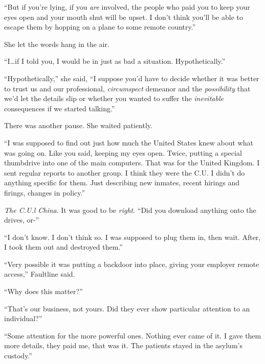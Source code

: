 ``But if you're lying, if you \emph{are} involved, the people who paid you to keep your eyes open and your mouth shut will be upset.  I don't think you'll be able to escape them by hopping on a plane to some remote country.''



She let the words hang in the air.



``I\ldots if I told you, I would be in just as bad a situation.  Hypothetically.''



``Hypothetically,'' she said, ``I suppose you'd have to decide whether it was better to trust us and our professional, \emph{circumspect }demeanor and the \emph{possibility} that we'd let the details slip or whether you wanted to suffer the \emph{inevitable} consequences if we started talking.''



There was another pause.  She waited patiently.



``I was supposed to find out just how much the United States knew about what was going on.  Like you said, keeping my eyes open.  Twice, putting a special thumbdrive into one of the main computers.  That was for the United Kingdom.  I sent regular reports to another group.  I think they were the C.U.  I didn't do anything specific for them.  Just describing new inmates, recent hirings and firings, changes in policy.''



\emph{The C.U.l  China}.  It was good to be \emph{right}.  ``Did you download anything onto the drives, or-''



``I don't know.  I don't think so.  I was supposed to plug them in, then wait.  After, I took them out and destroyed them.''



``Very possible it was putting a backdoor into place, giving your employer remote access,'' Faultline said.



``Why does this matter?''



``That's our business, not yours.  Did they ever show particular attention to an individual?''



``Some attention for the more powerful ones.  Nothing ever came of it.  I gave them more details, they paid me, that was it.  The patients stayed in the asylum's custody.''



